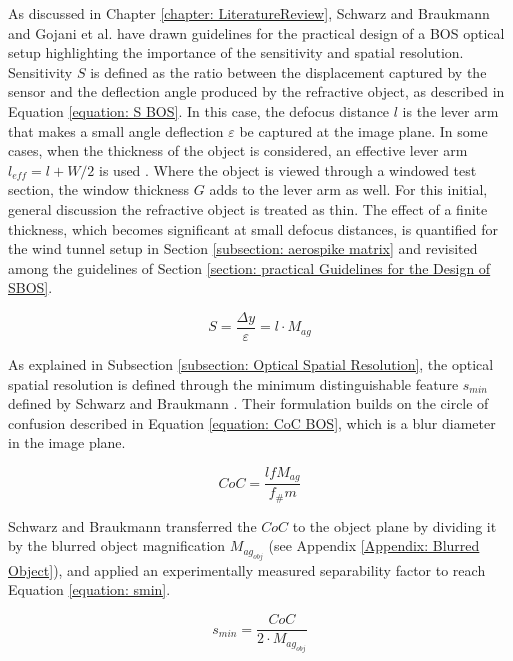 \par As discussed in Chapter \ref{chapter: LiteratureReview}, Schwarz and Braukmann \cite{Schwarz&Braukmann} and Gojani et al. \cite{Gojani&Obayashi} have drawn guidelines for the practical design of a BOS optical setup highlighting the importance of the sensitivity and spatial resolution. Sensitivity $S$ is defined as the ratio between the displacement captured by the sensor and the deflection angle produced by the refractive object, as described in Equation \ref{equation: S BOS}. In this case, the defocus distance $l$ is the lever arm that makes a small angle deflection $\varepsilon$ be captured at the image plane. In some cases, when the thickness of the object is considered, an effective lever arm $l_{eff} = l + W/2$ is used \cite{Dalziel2000, vanHinsberg2014}. Where the object is viewed through a windowed test section, the window thickness $G$ adds to the lever arm as well. For this initial, general discussion the refractive object is treated as thin. The effect of a finite thickness, which becomes significant at small defocus distances, is quantified for the wind tunnel setup in Section \ref{subsection: aerospike matrix} and revisited among the guidelines of Section \ref{section: practical Guidelines for the Design of SBOS}. 

\begin{equation}
    \label{equation: S BOS}
    S = \frac{\Delta y}{\varepsilon} = l \cdot M_{ag} 
\end{equation}

\par As explained in Subsection \ref{subsection: Optical Spatial Resolution}, the optical spatial resolution is defined through the minimum distinguishable feature $s_{min}$ defined by Schwarz and Braukmann \cite{Schwarz&Braukmann}. Their formulation builds on the circle of confusion described in Equation \ref{equation: CoC BOS}, which is a blur diameter in the image plane.

\begin{equation}
    \label{equation: CoC BOS}
    CoC = \frac{lfM_{ag}}{f_\#m}
\end{equation}

Schwarz and Braukmann \cite{Schwarz&Braukmann} transferred the $CoC$ to the object plane by dividing it by the blurred object magnification $M_{ag_{obj}}$ (see Appendix \ref{Appendix: Blurred Object}), and applied an experimentally measured separability factor to reach Equation \ref{equation: smin}.

\begin{equation}
    \label{equation: smin}
    s_{min} = \frac{CoC}{2 \cdot M_{ag_{obj}}}
\end{equation}

